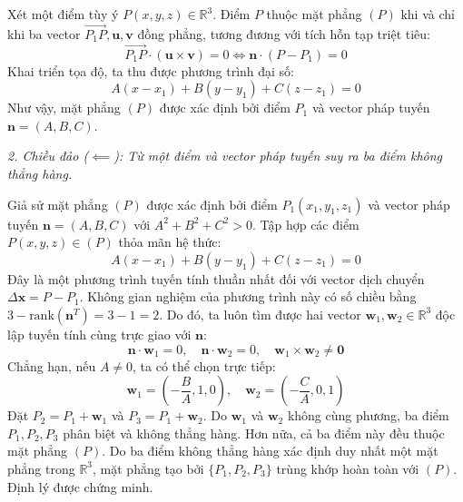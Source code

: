 Xét một điểm tùy ý $P(x, y, z) \in \mathbb{R}^3$. Điểm $P$ thuộc mặt phẳng $(P)$ khi và chỉ khi ba vector $\vec{P_1P}, \mathbf{u}, \mathbf{v}$ đồng phẳng, tương đương với tích hỗn tạp triệt tiêu:
\begin{equation}
\label{eq:plane_box_product}
\vec{P_1P} \cdot (\mathbf{u} \times \mathbf{v}) = 0 \iff \mathbf{n} \cdot (P - P_1) = 0
\end{equation}
Khai triển tọa độ, ta thu được phương trình đại số:
\begin{equation}
A(x - x_1) + B(y - y_1) + C(z - z_1) = 0
\end{equation}
Như vậy, mặt phẳng $(P)$ được xác định bởi điểm $P_1$ và vector pháp tuyến $\mathbf{n} = (A, B, C)$.

\textit{2. Chiều đảo ($\impliedby$): Từ một điểm và vector pháp tuyến suy ra ba điểm không thẳng hàng.}

Giả sử mặt phẳng $(P)$ được xác định bởi điểm $P_1(x_1, y_1, z_1)$ và vector pháp tuyến $\mathbf{n} = (A, B, C)$ với $A^2 + B^2 + C^2 > 0$. Tập hợp các điểm $P(x, y, z) \in (P)$ thỏa mãn hệ thức:
\begin{equation}
A(x - x_1) + B(y - y_1) + C(z - z_1) = 0
\end{equation}
Đây là một phương trình tuyến tính thuần nhất đối với vector dịch chuyển $\Delta \mathbf{x} = P - P_1$. Không gian nghiệm của phương trình này có số chiều bằng $3 - \text{rank}(\mathbf{n}^T) = 3 - 1 = 2$. Do đó, ta luôn tìm được hai vector $\mathbf{w}_1, \mathbf{w}_2 \in \mathbb{R}^3$ độc lập tuyến tính cùng trực giao với $\mathbf{n}$:
\begin{equation}
\mathbf{n} \cdot \mathbf{w}_1 = 0, \quad \mathbf{n} \cdot \mathbf{w}_2 = 0, \quad \mathbf{w}_1 \times \mathbf{w}_2 \neq \mathbf{0}
\end{equation}
Chẳng hạn, nếu $A \neq 0$, ta có thể chọn trực tiếp:
\begin{equation}
\mathbf{w}_1 = \left( -\frac{B}{A}, 1, 0 \right), \quad \mathbf{w}_2 = \left( -\frac{C}{A}, 0, 1 \right)
\end{equation}
Đặt $P_2 = P_1 + \mathbf{w}_1$ và $P_3 = P_1 + \mathbf{w}_2$. Do $\mathbf{w}_1$ và $\mathbf{w}_2$ không cùng phương, ba điểm $P_1, P_2, P_3$ phân biệt và không thẳng hàng. Hơn nữa, cả ba điểm này đều thuộc mặt phẳng $(P)$. Do ba điểm không thẳng hàng xác định duy nhất một mặt phẳng trong $\mathbb{R}^3$, mặt phẳng tạo bởi $\{P_1, P_2, P_3\}$ trùng khớp hoàn toàn với $(P)$. Định lý được chứng minh.

